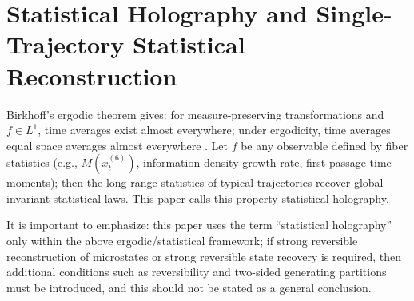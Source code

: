 \section{Statistical Holography and Single-Trajectory Statistical Reconstruction}

Birkhoff's ergodic theorem gives: for measure-preserving transformations and $f\in L^1$, time averages exist almost everywhere; under ergodicity, time averages equal space averages almost everywhere \cite{EOM_Birkhoff}.
Let $f$ be any observable defined by fiber statistics (e.g., $M(x_t^{(6)})$, information density growth rate, first-passage time moments); then the long-range statistics of typical trajectories recover global invariant statistical laws. This paper calls this property statistical holography.

It is important to emphasize: this paper uses the term ``statistical holography'' only within the above ergodic/statistical framework; if strong reversible reconstruction of microstates or strong reversible state recovery is required, then additional conditions such as reversibility and two-sided generating partitions must be introduced, and this should not be stated as a general conclusion.
